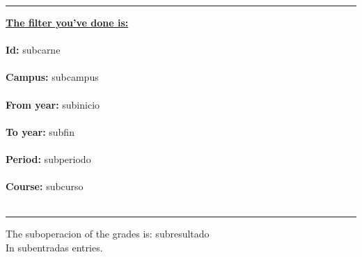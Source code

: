 \documentclass[11pt]{article} %
\begin{document}
\pagestyle{fancy}
\setlength{\headheight}{30pt}
\rule{\linewidth}{0.2mm}
\vspace{10pt}

\underline{\textbf{The filter you've done is:}}\\ \\
 
\textbf{Id:} subcarne\\ \\
\textbf{Campus:} subcampus\\ \\
\textbf{From year:} subinicio\\ \\
\textbf{To year:} subfin\\ \\
\textbf{Period:} subperiodo\\ \\
\textbf{Course:} subcurso\\ \\
\rule{\linewidth}{0.2mm}

The suboperacion of the grades is: subresultado\\
In subentradas entries.
\end{document}

